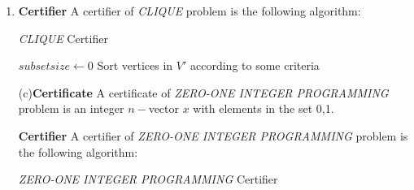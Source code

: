 \documentclass[12pt,a4paper]{article}
\makeatletter
\newtheorem*{solution}{Solution}
\theoremstyle{definition}
\renewenvironment{solution}[1][Solution] {\par\pushQED{\qed}\normalfont\topsep6\p@\@plus6\p@\relax\trivlist\item[\hskip\labelsep\bfseries#1\@addpunct{.}]\ignorespaces}{\popQED\endtrivlist\@endpefalse} \makeatother
\makeatother
\begin{document}
\begin{enumerate}
\begin{solution}
            \textbf{Certifier} \;A certifier of \emph{CLIQUE} problem is the following algorithm:\newline
            \begin{minipage}[t]{0.9\textwidth}
                \begin{algorithm}[H]
                  \BlankLine
                  \caption{\emph{CLIQUE} Certifier}
                  \BlankLine
                  $subsetsize\leftarrow0$\;
                  Sort vertices in $V'$ according to some criteria\;
                \end{algorithm}
                \end{minipage}

                (c)\textbf{Certificate} \;A certificate of \emph{ZERO-ONE INTEGER PROGRAMMING} problem is an integer $n-$vector $x$ with elements in the set {0,1}.

                \textbf{Certifier} \;A certifier of \emph{ZERO-ONE INTEGER PROGRAMMING} problem is the following algorithm:\newline
                \begin{minipage}[t]{0.9\textwidth}
                    \begin{algorithm}[H]
                      \BlankLine
                      \caption{\emph{ZERO-ONE INTEGER PROGRAMMING} Certifier}
                      \BlankLine
                    \end{algorithm}
                    \end{minipage}
                     

\end{solution}
\end{enumerate}
\end{document}
